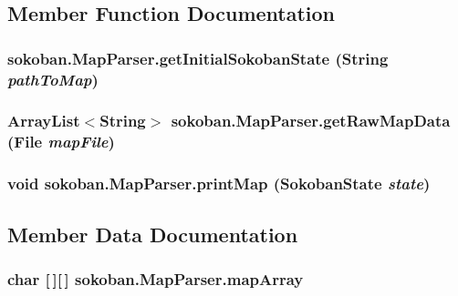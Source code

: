 \subsection{Member Function Documentation}
\hypertarget{classsokoban_1_1MapParser_c8dfcc9b27e2dc9f2faebb7c22db57fe}{
\subsubsection[{getInitialSokobanState}]{ sokoban.MapParser.getInitialSokobanState (String {\em pathToMap})}}
\label{classsokoban_1_1MapParser_c8dfcc9b27e2dc9f2faebb7c22db57fe}


\hypertarget{classsokoban_1_1MapParser_2df2717eade1b9f2cbb0d48bd3ad596d}{
\subsubsection[{getRawMapData}]{\setlength{\rightskip}{0pt plus 5cm}ArrayList$<$String$>$ sokoban.MapParser.getRawMapData (File {\em mapFile})}}
\label{classsokoban_1_1MapParser_2df2717eade1b9f2cbb0d48bd3ad596d}


\hypertarget{classsokoban_1_1MapParser_8a5151d7df76e046e12cb2361cddfbda}{
\subsubsection[{printMap}]{\setlength{\rightskip}{0pt plus 5cm}void sokoban.MapParser.printMap ({\bf SokobanState} {\em state})}}
\label{classsokoban_1_1MapParser_8a5151d7df76e046e12cb2361cddfbda}




\subsection{Member Data Documentation}
\hypertarget{classsokoban_1_1MapParser_a86d9f625141d7319c2ba02a635cf939}{
\subsubsection[{mapArray}]{\setlength{\rightskip}{0pt plus 5cm}char \mbox{[}$\,$\mbox{]}\mbox{[}$\,$\mbox{]} {\bf sokoban.MapParser.mapArray}}}
\label{classsokoban_1_1MapParser_a86d9f625141d7319c2ba02a635cf939}


